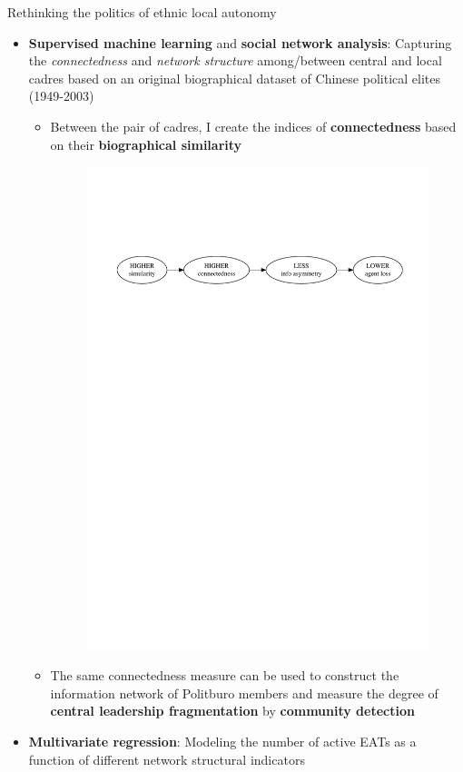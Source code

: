 \documentclass[
  10pt,
  ignorenonframetext,
]{beamer}
\begin{document}
\begin{frame}{Rethinking the politics of ethnic local autonomy}
\label{rethinking-the-politics-of-ethnic-local-autonomy-2}
\begin{itemize}
  \item \textbf{Supervised machine learning} and \textbf{social network analysis}: Capturing the \textit{connectedness} and \textit{network structure} among/between central and local cadres based on an original biographical dataset of Chinese political elites (1949-2003)
  \begin{itemize}
    \item Between the pair of cadres, I create the indices of \textbf{connectedness} based on their \textbf{biographical similarity}
    \begin{figure}
    \centering
    \includegraphics[scale=0.52]{Figs/cpen}
    \end{figure}
    \item The same connectedness measure can be used to construct the information network of Politburo members and measure the degree of \textbf{central leadership fragmentation} by \textbf{community detection}
  \end{itemize}
  \vspace{0.3cm}
  \item \textbf{Multivariate regression}: Modeling the number of active EATs as a function of different network structural indicators
\end{itemize}
\end{frame}
\end{document}
